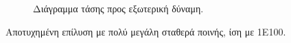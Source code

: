 \documentclass{article}
\begin{document}
\begin{figure}[H]
\begin{subfigure}{0.3\linewidth}
        \caption{Διάγραμμα τάσης προς εξωτερική δύναμη.}
    \end{subfigure}
    \caption{Αποτυχημένη επίλυση με πολύ μεγάλη σταθερά ποινής, ίση με 1E100.}
    \label{fig:astox}
\end{figure}
\end{document}
